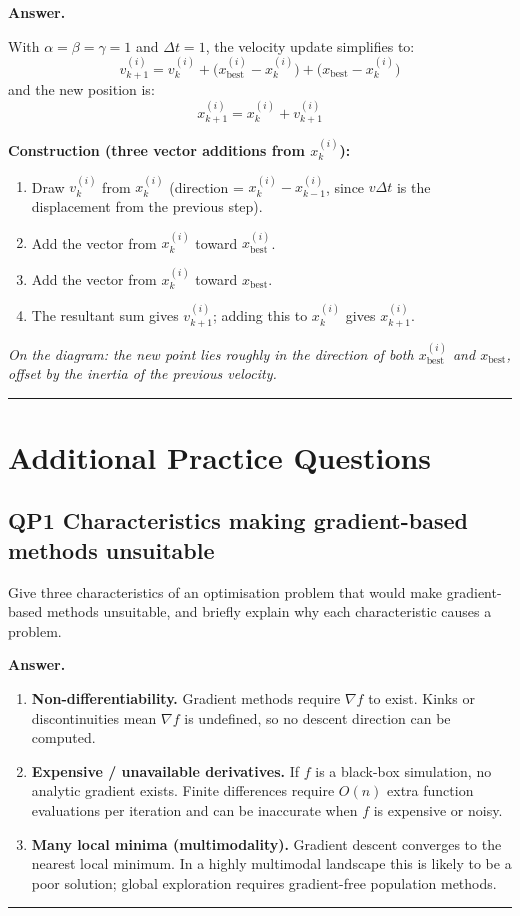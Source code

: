 \documentclass[11pt,a4paper]{article}
\newcommand{\Q}[2]{\subsection*{Q#1 \quad #2}}
\newenvironment{answer}{\medskip\textbf{Answer.}\par}{\bigskip\hrule\bigskip}
\begin{document}
\begin{answer}
With $\alpha = \beta = \gamma = 1$ and $\Delta t = 1$, the velocity
update simplifies to:
\[
  v^{(i)}_{k+1}
    = v^{(i)}_k
    + \bigl(x^{(i)}_\text{best} - x^{(i)}_k\bigr)
    + \bigl(x_\text{best}        - x^{(i)}_k\bigr)
\]
and the new position is:
\[
  x^{(i)}_{k+1} = x^{(i)}_k + v^{(i)}_{k+1}
\]

\textbf{Construction (three vector additions from $x^{(i)}_k$):}
\begin{enumerate}[leftmargin=*, label=Step \arabic{*}.]
  \item Draw $v^{(i)}_k$ from $x^{(i)}_k$
        (direction = $x^{(i)}_k - x^{(i)}_{k-1}$, since $v\Delta t$
        is the displacement from the previous step).
  \item Add the vector from $x^{(i)}_k$ toward $x^{(i)}_\text{best}$.
  \item Add the vector from $x^{(i)}_k$ toward $x_\text{best}$.
  \item The resultant sum gives $v^{(i)}_{k+1}$; adding this to
        $x^{(i)}_k$ gives $x^{(i)}_{k+1}$.
\end{enumerate}

\textit{On the diagram: the new point lies roughly in the direction
of both $x^{(i)}_\text{best}$ and $x_\text{best}$, offset by the
inertia of the previous velocity.}
\end{answer}

\newpage
\section*{Additional Practice Questions}

\Q{P1}{[3 marks] Characteristics making gradient-based methods unsuitable}
Give three characteristics of an optimisation problem that would make
gradient-based methods unsuitable, and briefly explain why each
characteristic causes a problem.

\begin{answer}
\begin{enumerate}[leftmargin=*, label=\arabic{*}.]
  \item \textbf{Non-differentiability.}
    Gradient methods require $\nabla f$ to exist.  Kinks or discontinuities
    mean $\nabla f$ is undefined, so no descent direction can be computed.

  \item \textbf{Expensive / unavailable derivatives.}
    If $f$ is a black-box simulation, no analytic gradient exists.
    Finite differences require $O(n)$ extra function evaluations per
    iteration and can be inaccurate when $f$ is expensive or noisy.

  \item \textbf{Many local minima (multimodality).}
    Gradient descent converges to the nearest local minimum.
    In a highly multimodal landscape this is likely to be a poor solution;
    global exploration requires gradient-free population methods.
\end{enumerate}
\end{answer}
\end{document}

